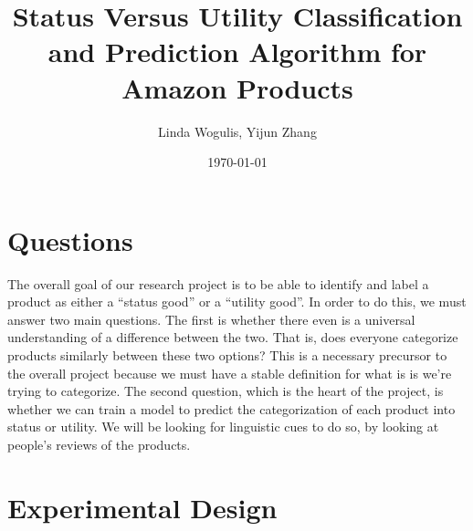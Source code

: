 \documentclass[dvips,12pt]{article}
\begin{document}

\title{\textbf{Status Versus Utility Classification and Prediction Algorithm for Amazon Products}}
\author{Linda Wogulis, Yijun Zhang}
\date{\today}



\maketitle


\section{Questions}


The overall goal of our research project is to be able to identify and label a product as either a “status good” or a “utility good”. In order to do this, we must answer two main questions. The first is whether there even is a universal understanding of a difference between the two. That is, does everyone categorize products similarly between these two options? This is a necessary precursor to the overall project because we must have a stable definition for what is is we’re trying to categorize. The second question, which is the heart of the project, is whether we can train a model to predict the categorization of each product into status or utility. We will be looking for linguistic cues to do so, by looking at people’s reviews of the products. 



\section{Experimental Design}
\end{document}
